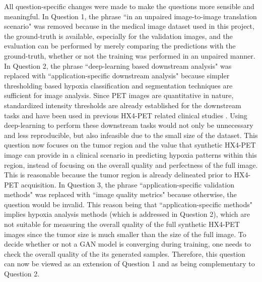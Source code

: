 All question-specific changes were made to make the questions more sensible and meaningful. In Question 1, the phrase ``in an unpaired image-to-image translation scenario" was removed because in the medical image dataset used in this project, the ground-truth is available, especially for the validation images, and the evaluation can be performed by merely comparing the predictions with the ground-truth, whether or not the training was performed in an unpaired manner. In Question 2, the phrase ``deep-learning based downstream analysis" was replaced with ``application-specific downstream analysis" because simpler thresholding based hypoxia classification and segmentation techniques are sufficient for image analysis. Since PET images are quantitative in nature, standardized intensity thresholds are already established for the downstream tasks and have been used in previous HX4-PET related clinical studies \cite{zegers2013hypoxia, even2017predicting, sanduleanu2020hypoxia}. Using deep-learning to perform these downstream tasks would not only be unnecessary and less reproducible, but also infeasible due to the small size of the dataset. This question now focuses on the tumor region and the value that synthetic HX4-PET image can provide in a clinical scenario in predicting hypoxia patterns within this region, instead of focusing on the overall quality and perfectness of the full image. This is reasonable because the tumor region is already delineated prior to HX4-PET acquisition. In Question 3, the phrase ``application-specific validation methods" was replaced with ``image quality metrics" because otherwise, the question would be invalid. This reason being that ``application-specific methods" implies hypoxia analysis methods (which is addressed in Question 2), which are not suitable for measuring the overall quality of the full synthetic HX4-PET images since the tumor size is much smaller than the size of the full image. To decide whether or not a GAN model is converging during training, one needs to check the overall quality of the its generated samples. Therefore, this question can now be viewed as an extension of Question 1 and as being complementary to Question 2. 